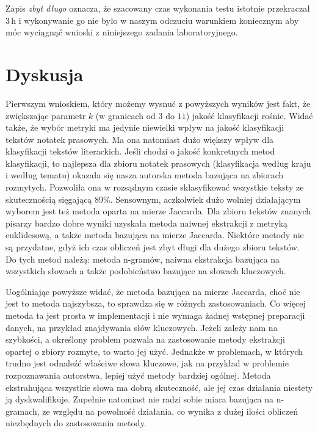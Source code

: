 \documentclass[a4paper]{classrep}
\begin{document}
Zapis \emph{zbyt długo} oznacza, że szacowany czas wykonania testu istotnie przekraczał $3\,\mbox{h}$ i wykonywanie
go nie było w naszym odczuciu warunkiem koniecznym aby móc wyciągnąć wnioski z niniejszego zadania laboratoryjnego.

\section{Dyskusja}
Pierwszym wnioskiem, który możemy wysnuć z powyższych wyników jest fakt, że zwiększając parametr \(k\) (w granicach od \(3\) do \(11\)) jakość klasyfikacji rośnie. Widać także,
że wybór metryki ma jedynie niewielki wpływ na jakość klasyfikacji tekstów notatek prasowych. Ma ona natomiast dużo większy wpływ dla klasyfikacji tekstów literackich.
Jeśli chodzi o jakość konkretnych metod klasyfikacji, to najlepsza dla zbioru notatek prasowych (klasyfikacja według kraju i według tematu)
okazała się nasza autorska metoda bazująca na zbiorach rozmytych. Pozwoliła ona w rozsądnym czasie sklasyfikować wszystkie teksty ze skutecznością sięgającą 89\%. Sensownym, aczkolwiek
dużo wolniej działającym wyborem jest też metoda oparta na mierze Jaccarda.
Dla zbioru tekstów znanych pisarzy bardzo dobre wyniki uzyskała metoda naiwnej ekstrakcji z metryką euklidesową,
a także metoda bazująca na mierze Jaccarda. Niektóre metody nie są przydatne, gdyż ich czas obliczeń jest zbyt długi dla dużego zbioru tekstów. Do tych metod należą:
metoda n-gramów, naiwna ekstrakcja bazująca na wszystkich słowach a także podobieństwo bazujące na słowach kluczowych.

Uogólniając powyższe widać, że metoda bazująca na mierze Jaccarda, choć nie jest to metoda najszybsza, to sprawdza się w różnych zastosowaniach. Co więcej metoda ta jest
prosta w implementacji i nie wymaga żadnej wstępnej preparacji danych, na przykład znajdywania słów kluczowych. Jeżeli zależy nam na szybkości, a określony problem pozwala
na zastosowanie metody ekstrakcji opartej o zbiory rozmyte, to warto jej użyć. Jednakże w problemach, w których trudno jest odnaleźć właściwe słowa kluczowe, jak na przykład
w problemie rozpoznawania autorstwa, lepiej użyć metody bardziej ogólnej. Metoda ekstrahująca wszystkie słowa ma dobrą skuteczność, ale jej czas działania  niestety ją dyskwalifikuje.
Zupełnie natomiast nie radzi sobie miara bazująca na n-gramach, ze względu na powolność działania, co wynika z dużej ilości obliczeń niezbędnych do zastosowania metody. 
\end{document}
